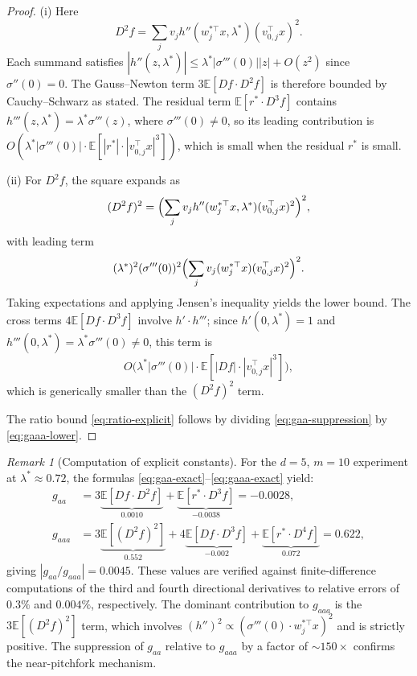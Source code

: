 \documentclass[11pt, reqno]{amsart}
\theoremstyle{plain}
\theoremstyle{definition}
\theoremstyle{remark}
\newtheorem{remark}[theorem]{Remark}
\begin{document}
\begin{proof}
(i) Here
\[
  D^2f=\sum_j v_j h''(w_j^{*\top}x,\lambda^*)(v_{0,j}^\top x)^2.
\]
Each summand satisfies $|h''(z,\lambda^*)|\le\lambda^*|\sigma'''(0)||z|+O(z^2)$ since $\sigma''(0)=0$.  The Gauss--Newton term $3\mathbb E[Df\cdot D^2f]$ is therefore bounded by Cauchy--Schwarz as stated.  The residual term $\mathbb E[r^*\cdot D^3f]$ contains $h'''(z,\lambda^*)=\lambda^*\sigma'''(z)$, where $\sigma'''(0)\neq 0$, so its leading contribution is $O(\lambda^*|\sigma'''(0)|\cdot\mathbb E[|r^*|\cdot|v_{0,j}^\top x|^3])$, which is small when the residual $r^*$ is small.

(ii) For $D^2f$, the square expands as
\[
  (D^2f)^2=\Bigl(\sum_j v_j h''(w_j^{*\top}x,\lambda^*)(v_{0,j}^\top x)^2\Bigr)^2,
\]
with leading term
\[
  (\lambda^*)^2(\sigma'''(0))^2\Bigl(\sum_j v_j(w_j^{*\top}x)(v_{0,j}^\top x)^2\Bigr)^2.
\]
Taking expectations and applying Jensen's inequality yields the lower bound.  The cross terms $4\mathbb E[Df\cdot D^3f]$ involve $h'\cdot h'''$; since $h'(0,\lambda^*)=1$ and $h'''(0,\lambda^*)=\lambda^*\sigma'''(0)\neq 0$, this term is
\[
  O\bigl(\lambda^*|\sigma'''(0)|\cdot\mathbb E[|Df|\cdot|v_{0,j}^\top x|^3]\bigr),
\]
which is generically smaller than the $(D^2f)^2$ term.

The ratio bound \eqref{eq:ratio-explicit} follows by dividing \eqref{eq:gaa-suppression} by \eqref{eq:gaaa-lower}.
\end{proof}

\begin{remark}[Computation of explicit constants]\label{rem:constants-verified}
For the $d=5$, $m=10$ experiment at $\lambda^*\approx 0.72$, the formulas \eqref{eq:gaa-exact}--\eqref{eq:gaaa-exact} yield:
\begin{equation}
\begin{aligned}
  g_{aa} &= 3\underbrace{\mathbb E[Df\cdot D^2f]}_{0.0010} + \underbrace{\mathbb E[r^*\cdot D^3f]}_{-0.0038} = -0.0028,\\
  g_{aaa}&= 3\underbrace{\mathbb E[(D^2f)^2]}_{0.552} + 4\underbrace{\mathbb E[Df\cdot D^3f]}_{-0.002} + \underbrace{\mathbb E[r^*\cdot D^4f]}_{0.072} = 0.622,
\end{aligned}
\end{equation}
giving $|g_{aa}/g_{aaa}|=0.0045$.  These values are verified against finite-difference computations of the third and fourth directional derivatives to relative errors of $0.3\%$ and $0.004\%$, respectively.  The dominant contribution to $g_{aaa}$ is the $3\mathbb E[(D^2f)^2]$ term, which involves $(h'')^2\propto(\sigma'''(0)\cdot w_j^{*\top}x)^2$ and is strictly positive.  The suppression of $g_{aa}$ relative to $g_{aaa}$ by a factor of $\sim 150\times$ confirms the near-pitchfork mechanism.
\end{remark}
\end{document}
